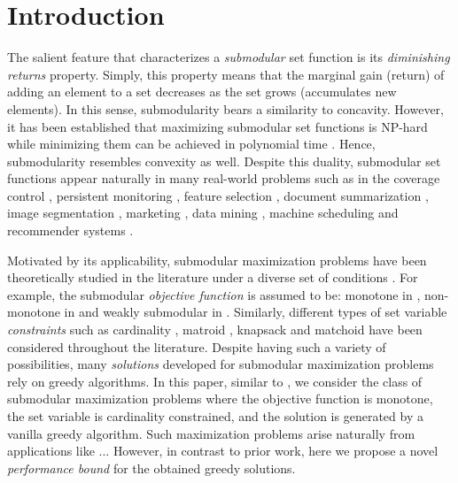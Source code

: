 \documentclass[conference]{IEEEtran}
\begin{document}
\thispagestyle{empty} \pagestyle{empty}





\section{Introduction}

The salient feature that characterizes a \emph{submodular} set function is its \emph{diminishing returns} property. Simply, this property means that the marginal gain (return) of adding an element to a set decreases as the set grows (accumulates new elements). In this sense, submodularity bears a similarity to concavity. However, it has been established that maximizing submodular set functions is NP-hard \cite{Corneuejols1977,Nemhauser1978} while minimizing them can be achieved in polynomial time \cite{Grotschel1981,Schrijver2000}. Hence, submodularity resembles convexity as well. Despite this duality, submodular set functions appear naturally in many real-world problems such as in the coverage control \cite{Sun2020,Sun2019}, persistent monitoring \cite{Rezazadeh2019}, feature selection \cite{Das2008}, document summarization \cite{lin-bilmes-2011-class}, image segmentation \cite{Jegelka2011}, marketing \cite{Kempe2003}, data mining \cite{Mirzasoleiman2013}, machine scheduling \cite{LiuSiwen2020} and recommender systems \cite{El-Arini2011}.



Motivated by its applicability, submodular maximization problems have been theoretically studied in the literature under a diverse set of conditions \cite{Liu2020}. For example, the submodular \emph{objective function} is assumed to be: monotone in \cite{Wang2016}, non-monotone in \cite{Fahrbach2019} and weakly submodular in \cite{Khanna2017}. Similarly, different types of set variable \emph{constraints} such as cardinality \cite{Nemhauser1978}, matroid \cite{Fisher1978}, knapsack \cite{Wolsey1984} and matchoid \cite{Badanidiyuru2020} have been considered throughout the literature. Despite having such a variety of possibilities, many \emph{solutions} developed for submodular maximization problems rely on greedy algorithms. In this paper, similar to \cite{Nemhauser1978,Conforti1984,Wang2016,Liu2018}, we consider the class of submodular maximization problems where the objective function is monotone, the set variable is cardinality constrained, and the solution is generated by a vanilla greedy algorithm. {\color{red} Such maximization problems arise naturally from applications like ... } 
However, in contrast to prior work, here we propose a novel \emph{performance bound} for the obtained greedy solutions.   
\end{document}

